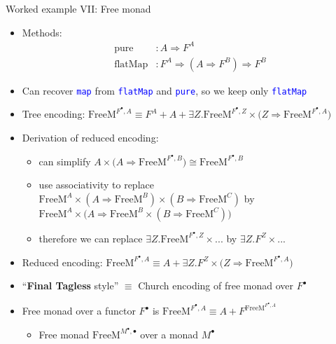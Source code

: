 \documentclass[english,,russian]{beamer}
\begin{document}
\begin{frame}{Worked example VII: Free monad}
\begin{itemize}
\item {\footnotesize{}\vspace{-0.25cm}}Methods:{\footnotesize{}\vspace{-0.25cm}}
\begin{align*}
\text{pure} & :A\Rightarrow F^{A}\\
\text{flatMap} & :F^{A}\Rightarrow(A\Rightarrow F^{B})\Rightarrow F^{B}
\end{align*}
\item {\footnotesize{}\vspace{-0.25cm}}Can recover \texttt{\textcolor{blue}{\footnotesize{}map}}
from \texttt{\textcolor{blue}{\footnotesize{}flatMap}} and \texttt{\textcolor{blue}{\footnotesize{}pure}},
so we keep only \texttt{\textcolor{blue}{\footnotesize{}flatMap}} 
\item Tree encoding: {\footnotesize{}$\text{FreeM}^{F^{\bullet},A}\equiv F^{A}+A+\exists Z.\text{FreeM}^{F^{\bullet},Z}\times\big(Z\Rightarrow\text{FreeM}^{F^{\bullet},A}\big)$}{\footnotesize\par}
\item Derivation of reduced encoding: 
\begin{itemize}
\item can simplify $A\times\big(A\Rightarrow\text{FreeM}^{F^{\bullet},B}\big)\cong\text{FreeM}^{F^{\bullet},B}$
\item use associativity to replace $\text{FreeM}^{A}\times(A\Rightarrow\text{FreeM}^{B})\times(B\Rightarrow\text{FreeM}^{C})$
by $\text{FreeM}^{A}\times\big(A\Rightarrow\text{FreeM}^{B}\times(B\Rightarrow\text{FreeM}^{C})\big)$
\item therefore we can replace $\exists Z.\text{FreeM}^{F^{\bullet},Z}\times...$
by $\exists Z.F^{Z}\times...$
\end{itemize}
\item Reduced encoding: $\text{FreeM}^{F^{\bullet},A}\equiv A+\exists Z.F^{Z}\times\big(Z\Rightarrow\text{FreeM}^{F^{\bullet},A}\big)$
\item ``\textbf{Final Tagless} style'' $\equiv$ Church encoding of free
monad over $F^{\bullet}$ 
\item Free monad over a functor $F^{\bullet}$ is $\text{FreeM}^{F^{\bullet},A}\equiv A+F^{\text{FreeM}^{F^{\bullet},A}}$
\begin{itemize}
\item Free monad $\text{FreeM}^{M^{\bullet},\bullet}$ over a monad $M^{\bullet}$

\end{itemize}
\end{itemize}
\end{frame}
\end{document}
